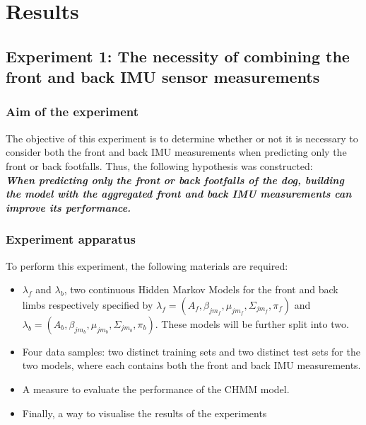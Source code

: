 \chapter{Results}

\section{Experiment 1: The necessity of combining the front and back IMU sensor measurements}

\subsection{Aim of the experiment}
The objective of this experiment is to determine whether or not it is necessary to consider both the front and back IMU measurements when predicting only the front or back footfalls. Thus, the following hypothesis was constructed:\\
\textbf{\textit{When predicting only the front or back footfalls of the dog, building the model with the aggregated front and back IMU measurements can improve its performance.}}

\subsection{Experiment apparatus}
To perform this experiment, the following materials are required:
\begin{itemize}
	\item \(\lambda_f\) and \(\lambda_b\), two continuous Hidden Markov Models for the front and back limbs respectively specified by \(\lambda_f = (A_f, \beta_{jm_f}, \mu_{jm_f}, \Sigma_{jm_f}, \pi_f)\) and \(\lambda_b = (A_b, \beta_{jm_b}, \mu_{jm_b}, \Sigma_{jm_b}, \pi_b)\). These models will be further split into two.
	\item Four data samples: two distinct training sets and two distinct test sets for the two models, where each contains both the front and back IMU measurements.
	\item A measure to evaluate the performance of the CHMM model.
	\item Finally, a way to visualise the results of the experiments
\end{itemize}

